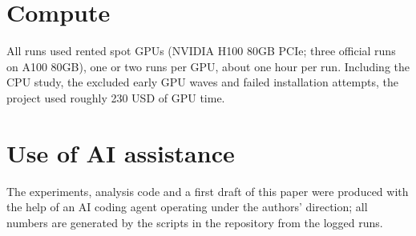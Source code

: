 \documentclass[10pt]{article}
\begin{document}
\section{Compute}
All runs used rented spot GPUs (NVIDIA H100 80GB PCIe; three official runs on A100 80GB), one or
two runs per GPU, about one hour per run. Including the CPU study, the excluded early GPU waves
and failed installation attempts, the project used roughly 230 USD of GPU time.

\section{Use of AI assistance}
The experiments, analysis code and a first draft of this paper were produced with the help of an
AI coding agent operating under the authors' direction; all numbers are generated by the
scripts in the repository from the logged runs.
\end{document}
